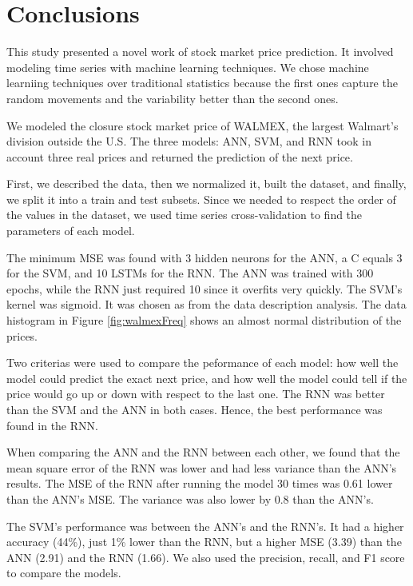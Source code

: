 \chapter{Conclusions}
\label{ch:conclusions}

This study presented a novel work of stock market price prediction. It involved modeling time series with machine learning techniques. We chose machine learniing techniques over traditional statistics because the first ones capture the random movements and the variability better than the second ones. 

We modeled the closure stock market price of WALMEX, the largest Walmart's division outside the U.S. The three models: ANN, SVM, and RNN took in account three real prices and returned the prediction of the next price.

First, we described the data, then we normalized it, built the dataset, and finally, we split it into a train and test subsets. Since we needed to respect the order of the values in the dataset, we used time series cross-validation to find the parameters of each model.

The minimum MSE was found with 3 hidden neurons for the ANN, a C equals 3 for the SVM, and 10 LSTMs for the RNN. The ANN was trained with 300 epochs, while the RNN just required 10 since it overfits very quickly. The SVM's kernel was sigmoid. It was chosen as from the data description analysis. The data histogram in Figure \ref{fig:walmexFreq} shows an almost normal distribution of the prices. 

Two criterias were used to compare the peformance of each model: how well the model could predict the exact next price, and how well the model could tell if the price would go up or down with respect to the last one. The RNN was better than the SVM and the ANN in both cases. Hence, the best performance was found in the RNN.

When comparing the ANN and the RNN between each other, we found that the mean square error of the RNN was lower and had less variance than the ANN's results. The MSE of the RNN after running the model 30 times was 0.61 lower than the ANN's MSE. The variance was also lower by 0.8 than the ANN's.

The SVM's performance was between the ANN's and the RNN's. It had a higher accuracy (44\%), just 1\% lower than the RNN, but a higher MSE (3.39) than the ANN (2.91) and the RNN (1.66). We also used the precision, recall, and F1 score to compare the models. 

